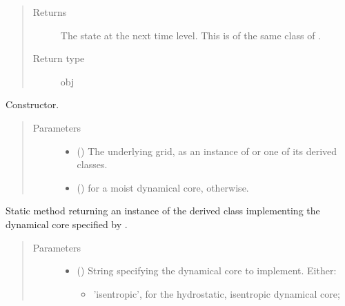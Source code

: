 \documentclass[letterpaper,10pt,english]{sphinxmanual}
\begin{document}
\begin{fulllineitems}
\begin{fulllineitems}
\begin{quote}
\begin{description}
\item[{Returns}] \leavevmode
The state at the next time level. This is of the same class of .

\item[{Return type}] \leavevmode
obj

\end{description}\end{quote}

\end{fulllineitems}


\begin{fulllineitems}
\label{\detokenize{api:dycore.dycore.DynamicalCore.__init__}}
Constructor.
\begin{quote}\begin{description}
\item[{Parameters}] \leavevmode\begin{itemize}
\item {} 
 () \textendash{} The underlying grid, as an instance of {\hyperref[\detokenize{api:grids.grid_xyz.GridXYZ}]{}} or one of its derived classes.

\item {} 
 () \textendash{}  for a moist dynamical core,  otherwise.

\end{itemize}

\end{description}\end{quote}

\end{fulllineitems}


\begin{fulllineitems}
\label{\detokenize{api:dycore.dycore.DynamicalCore.factory}}
Static method returning an instance of the derived class implementing the dynamical core specified by .
\begin{quote}\begin{description}
\item[{Parameters}] \leavevmode\begin{itemize}
\item {} 
 () \textendash{} 
String specifying the dynamical core to implement. Either:
\begin{itemize}
\item {} 
’isentropic’, for the hydrostatic, isentropic dynamical core;


\end{itemize}
\end{itemize}
\end{description}
\end{quote}
\end{fulllineitems}
\end{fulllineitems}
\end{document}
